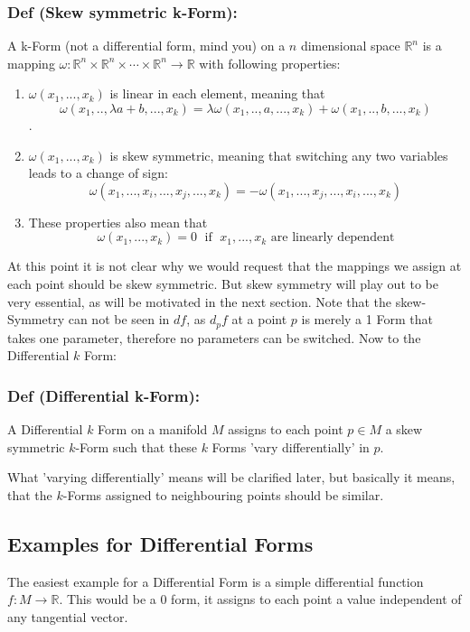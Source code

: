 \subsubsection*{\textbf{Def (Skew symmetric k-Form):}}
 A k-Form (not a differential form, mind you) on a $n$ dimensional space $\mathbb R^n$ is a mapping $\omega : \mathbb R^n \times \mathbb R^n\times \cdots \times  \mathbb R^n \rightarrow \mathbb R$ with following properties:
\begin{enumerate}
\item $\omega(x_1,...,x_k)$ is linear in each element, meaning that \[\omega(x_1,..,\lambda a + b,..., x_k) = \lambda \omega(x_1,..,a,..., x_k) + \omega(x_1,.., b,..., x_k)\].
\item $\omega(x_1,...,x_k)$ is skew symmetric, meaning that switching any two variables leads to a change of sign:
\[\omega(x_1,...,x_i,...,x_j,...,x_k) = - \omega(x_1,...,x_j,...,x_i,...,x_k)\]
\item These properties also mean that 
\[\omega(x_1,...,x_k) = 0 \;\text{ if }\;x_1,...,x_k \text{ are linearly dependent}\]
\end{enumerate}

At this point it is not clear why we would request that the mappings we assign at each point should be skew symmetric. But skew symmetry will play out to be very essential, as will be motivated in the next section. Note that the skew-Symmetry can not be seen in $df$, as $d_pf$ at a point $p$ is merely a 1 Form that takes one parameter, therefore no parameters can be switched. Now to the Differential $k$ Form:

\subsubsection*{\textbf{Def (Differential k-Form):}}
A Differential $k$ Form on a manifold $M$ assigns to each point $p\in M$ a skew symmetric $k$-Form such that these $k$ Forms 'vary differentially' in $p$. 

What 'varying differentially' means will be clarified later, but basically it means, that the $k$-Forms assigned to neighbouring points should be similar.


\subsection{Examples for Differential Forms}
The easiest example for a Differential Form is a simple differential function $f:M \rightarrow \mathbb R$. This would be a 0 form, it assigns to each point a value independent of any tangential vector.

